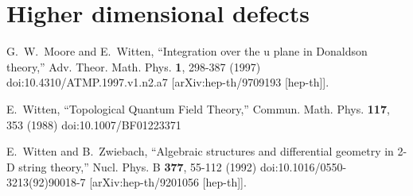 \documentclass[11pt]{amsart}
\begin{document}
\section{Higher dimensional defects} 


\begin{thebibliography}{KWWY14}

G.~W.~Moore and E.~Witten,
``Integration over the u plane in Donaldson theory,''
Adv. Theor. Math. Phys. \textbf{1}, 298-387 (1997)
doi:10.4310/ATMP.1997.v1.n2.a7
[arXiv:hep-th/9709193 [hep-th]].

E.~Witten,
``Topological Quantum Field Theory,''
Commun. Math. Phys. \textbf{117}, 353 (1988)
doi:10.1007/BF01223371


E.~Witten and B.~Zwiebach,
``Algebraic structures and differential geometry in 2-D string theory,''
Nucl. Phys. B \textbf{377}, 55-112 (1992)
doi:10.1016/0550-3213(92)90018-7
[arXiv:hep-th/9201056 [hep-th]].


\end{thebibliography}
\end{document}
